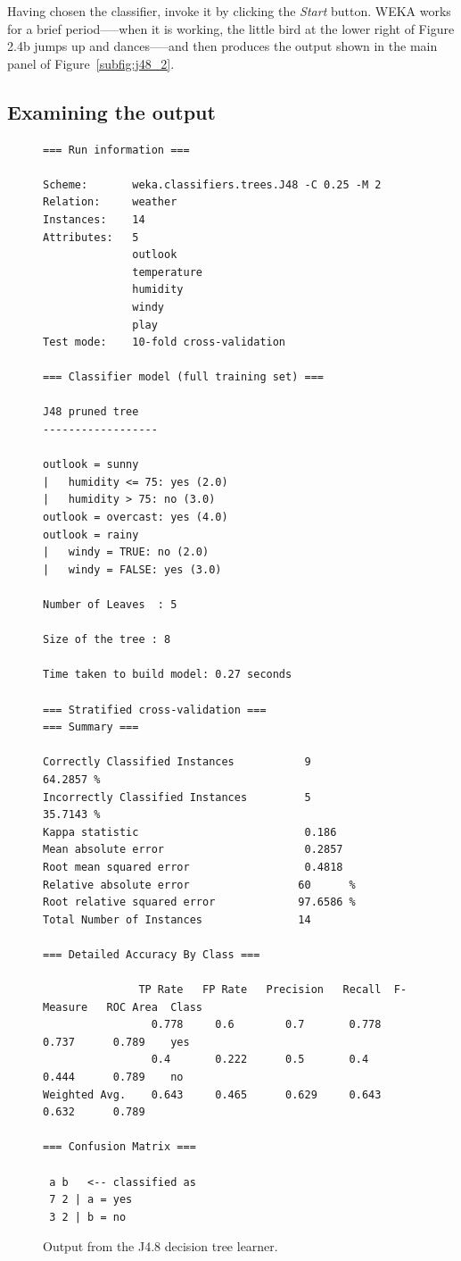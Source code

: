 Having chosen the classifier, invoke it by clicking the \textit{Start}
button. WEKA works for a brief period—--when it is working, the little
bird at the lower right of Figure 2.4b jumps up and dances--—and then
produces the output shown in the main panel of
Figure~\ref{subfig:j48_2}.

\subsection{Examining the output}

\begin{figure}[!th]
\begin{mdframed}[innermargin=-1cm]
\begin{Verbatim}[fontsize=\footnotesize]
=== Run information ===

Scheme:       weka.classifiers.trees.J48 -C 0.25 -M 2
Relation:     weather
Instances:    14
Attributes:   5
              outlook
              temperature
              humidity
              windy
              play
Test mode:    10-fold cross-validation

=== Classifier model (full training set) ===

J48 pruned tree
------------------

outlook = sunny
|   humidity <= 75: yes (2.0)
|   humidity > 75: no (3.0)
outlook = overcast: yes (4.0)
outlook = rainy
|   windy = TRUE: no (2.0)
|   windy = FALSE: yes (3.0)

Number of Leaves  : 5

Size of the tree : 8

Time taken to build model: 0.27 seconds

=== Stratified cross-validation ===
=== Summary ===

Correctly Classified Instances           9               64.2857 %
Incorrectly Classified Instances         5               35.7143 %
Kappa statistic                          0.186 
Mean absolute error                      0.2857
Root mean squared error                  0.4818
Relative absolute error                 60      %
Root relative squared error             97.6586 %
Total Number of Instances               14     

=== Detailed Accuracy By Class ===

               TP Rate   FP Rate   Precision   Recall  F-Measure   ROC Area  Class
                 0.778     0.6        0.7       0.778     0.737      0.789    yes
                 0.4       0.222      0.5       0.4       0.444      0.789    no
Weighted Avg.    0.643     0.465      0.629     0.643     0.632      0.789

=== Confusion Matrix ===

 a b   <-- classified as
 7 2 | a = yes
 3 2 | b = no
\end{Verbatim}
\end{mdframed}
\caption{\label{fig:j48_output}Output from the J4.8 decision tree learner.}
\end{figure}

